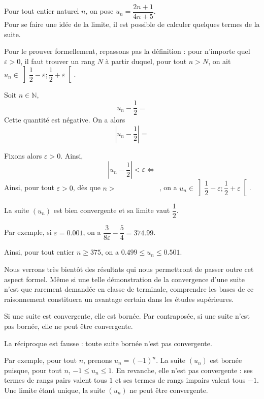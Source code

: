 \documentclass[11pt,fleqn]{book} %
\begin{document}
\begin{example} Pour tout entier naturel $n$, on pose $u_n=\dfrac{2n+1}{4n+5}$. \\
Pour se faire une idée de la limite, il est possible de calculer quelques termes de la suite. 

\vskip50pt
Pour le prouver formellement, repassons pas la définition  : pour n'importe quel $\varepsilon >0$, il faut trouver un rang $N$ à partir duquel, pour tout $n>N$, on ait $u_n \in \left] \dfrac{1}{2}-\varepsilon ; \dfrac{1}{2}+\varepsilon \right[$.

Soit $n\in\mathbb{N}$, 
\[u_n-\dfrac{1}{2}=\]
Cette quantité est négative. On a alors \[\left\lvert u_n - \dfrac{1}{2} \right\rvert = \]

Fixons alors $\varepsilon >0$. Ainsi, 
\[ \left\lvert u_n - \dfrac{1}{2} \right\rvert < \varepsilon \Leftrightarrow \]
Ainsi, pour tout $\varepsilon >0$, dès que $n  > \qquad\qquad\qquad $, on a $u_n \in \left] \dfrac{1}{2}-\varepsilon ; \dfrac{1}{2}+\varepsilon \right[$. 

La suite $(u_n)$ est bien convergente et sa limite vaut $\dfrac{1}{2}$.

Par exemple, si $\varepsilon = 0.001$, on a $\dfrac{3}{8\varepsilon}-\dfrac{5}{4}= 374.99$. 

Ainsi, pour tout entier $n\geqslant 375$, on a  $0.499 \leqslant u_n \leqslant 0.501$.\end{example}

Nous verrons très bientôt des résultats qui nous permettront de passer outre cet aspect formel. Même si une telle démonstration de la convergence d'une suite n'est que rarement demandée en classe de terminale, comprendre les bases de ce raisonnement constituera un avantage certain dans les études supérieures.

\begin{proposition}Si une suite est convergente, elle est bornée. Par contraposée, si une suite n'est pas bornée, elle ne peut être convergente.\end{proposition}

 La réciproque est fausse : toute suite bornée n'est pas convergente. 
 
Par exemple, pour tout $n$, prenons $u_n=(-1)^n$. La suite $(u_n)$ est bornée puisque, pour tout $n$, $-1 \leqslant u_n \leqslant 1$. En revanche, elle n'est pas convergente : ses termes de rangs pairs valent tous $1$ et ses termes de rangs impairs valent tous $-1$. Une limite étant unique, la suite $(u_n)$ ne peut être convergente.
\end{document}
